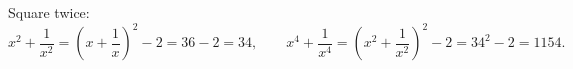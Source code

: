 Square twice:
\[x^2+\dfrac1{x^2}=\left(x+\dfrac1x\right)^2-2=36-2=34,\qquad x^4+\dfrac1{x^4}=\left(x^2+\dfrac1{x^2}\right)^2-2=34^2-2=\boxed{1154}.\]
